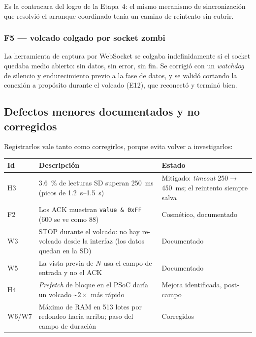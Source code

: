 Es la contracara del logro de la Etapa~4: el mismo mecanismo de
sincronizaci\'on que resolvi\'o el arranque coordinado ten\'ia un camino de
reintento sin cubrir.

\subsubsection{F5 --- volcado colgado por socket zombi}

La herramienta de captura por WebSocket se colgaba indefinidamente si el
socket quedaba medio abierto: sin datos, sin error, sin fin. Se corrigi\'o con
un \emph{watchdog} de silencio y endurecimiento previo a la fase de datos, y
se valid\'o cortando la conexi\'on a prop\'osito durante el volcado (E12), que
reconect\'o y termin\'o bien.

\subsection{Defectos menores documentados y no corregidos}

Registrarlos vale tanto como corregirlos, porque evita volver a investigarlos:

\begin{center}\small
\begin{tabularx}{\textwidth}{@{}l X l@{}}
\toprule
\textbf{Id} & \textbf{Descripci\'on} & \textbf{Estado} \\
\midrule
H3 & \SI{3.6}{\percent} de lecturas SD superan \SI{250}{\milli\second} (picos de \SIrange{1.2}{1.5}{\second}) & Mitigado: \emph{timeout} \SI{250}{}$\to$\SI{450}{\milli\second}; el reintento siempre salva \\
F2 & Los ACK muestran \texttt{value \& 0xFF} (600 se ve como 88) & Cosm\'etico, documentado \\
W3 & STOP durante el volcado: no hay re-volcado desde la interfaz (los datos quedan en la SD) & Documentado \\
W5 & La vista previa de $N$ usa el campo de entrada y no el ACK & Documentado \\
H4 & \emph{Prefetch} de bloque en el PSoC dar\'ia un volcado \textasciitilde{}$2\times$ m\'as r\'apido & Mejora identificada, post-campo \\
W6/W7 & M\'aximo de RAM en 513 lotes por redondeo hacia arriba; paso del campo de duraci\'on & Corregidos \\
\bottomrule
\end{tabularx}
\end{center}

